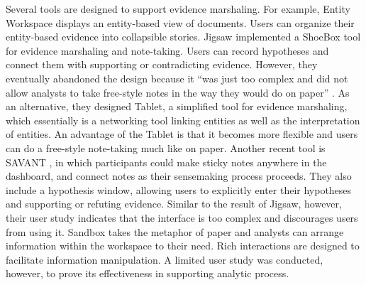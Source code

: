 Several tools are designed to support evidence marshaling. For example, Entity Workspace \citep{Bier2010} displays an entity-based view of documents. Users can organize their entity-based evidence into collapsible stories. Jigsaw \citep{Gorg2014} implemented a ShoeBox tool for evidence marshaling and note-taking. Users can record hypotheses and connect them with supporting or contradicting evidence. However, they eventually abandoned the design because it ``was just too complex and did not allow analysts to take free-style notes in the way they would do on paper'' \citep[p. 342]{Gorg2014}. As an alternative, they designed Tablet, a simplified tool for evidence marshaling, which essentially is a networking tool linking entities as well as the interpretation of entities. An advantage of the Tablet is that it becomes more flexible and users can do a free-style note-taking much like on paper. Another recent tool is SAVANT \citep{Goyal2016}, in which participants could make sticky notes anywhere in the dashboard, and connect notes as their sensemaking process proceeds. They also include a hypothesis window, allowing users to explicitly enter their hypotheses and supporting or refuting evidence. Similar to the result of Jigsaw, however, their user study indicates that the interface is too complex and discourages users from using it. Sandbox \citep{Wright2006} takes the metaphor of paper and analysts can arrange information within the workspace to their need. Rich interactions are designed to facilitate information manipulation. A limited user study was conducted, however, to prove its effectiveness in supporting analytic process.

